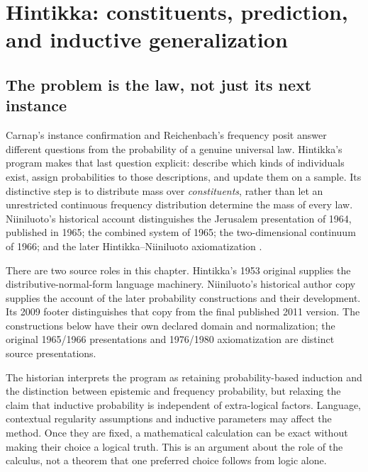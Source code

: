 \chapter{Hintikka: constituents, prediction, and inductive generalization}
\label{sec:p15-hintikka-inductive-logic}

\section{The problem is the law, not just its next instance}
\label{sec:p15-hintikka-program}

Carnap's instance confirmation and Reichenbach's frequency posit answer
different questions from the probability of a genuine universal law.
Hintikka's program makes that last question explicit: describe which
kinds of individuals exist, assign probabilities to those descriptions,
and update them on a sample. Its distinctive step is to distribute mass
over \emph{constituents}, rather than let an unrestricted continuous
frequency distribution determine the mass of every law.
Niiniluoto's historical account distinguishes the Jerusalem presentation
of 1964, published in 1965; the combined system of 1965; the two-dimensional
continuum of 1966; and the later Hintikka--Niiniluoto axiomatization
\cite[pp.~311--325]{Niiniluoto2011HintikkaProgramReading}.

There are two source roles in this chapter. Hintikka's 1953 original
supplies the distributive-normal-form language machinery. Niiniluoto's
historical author copy supplies the account of the later probability
constructions and their development. Its 2009 footer distinguishes that
copy from the final published 2011 version. The constructions below have
their own declared domain and normalization; the original 1965/1966
presentations and 1976/1980 axiomatization are distinct source presentations.

The historian interprets the program as retaining probability-based
induction and the distinction between epistemic and frequency probability,
but relaxing the claim that inductive probability is independent of
extra-logical factors. Language, contextual regularity assumptions and
inductive parameters may affect the method. Once they are fixed, a
mathematical calculation can be exact without making their choice a
logical truth. This is an argument about the role of the calculus, not
a theorem that one preferred choice follows from logic alone.

